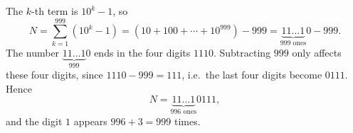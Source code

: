 The $k$-th term is $10^k-1$, so
\[
N=\sum_{k=1}^{999}\left(10^k-1\right)=(10+100+\cdots+10^{999})-999=\underbrace{11\ldots1}_{999\text{ ones}}0-999 .
\]
The number $\underbrace{11\ldots1}_{999}0$ ends in the four digits $1110$. Subtracting $999$ only affects these four digits, since $1110-999=111$, i.e.\ the last four digits become $0111$. Hence
\[
N=\underbrace{11\ldots1}_{996\text{ ones}}0111 ,
\]
and the digit $1$ appears $996+3=\boxed{999}$ times.
